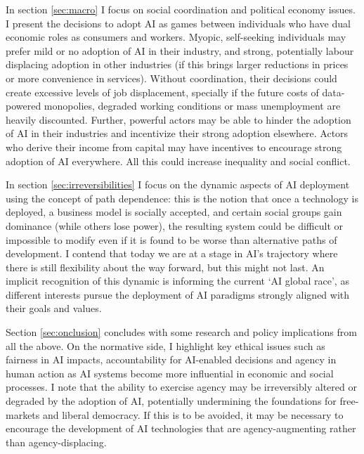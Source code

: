\documentclass[11pt]{article}
\begin{document}
 In section \ref{sec:macro} I focus on social coordination and political economy issues. I present the decisions to adopt AI as games between individuals who have dual economic roles as consumers and workers. Myopic, self-seeking individuals may prefer mild or no adoption of AI in their industry, and strong, potentially labour displacing adoption in other industries (if this brings larger reductions in prices or more convenience in services). Without coordination, their decisions could create excessive levels of job displacement, specially if the future costs of data-powered monopolies, degraded working conditions or mass unemployment are heavily discounted. Further, powerful actors may be able to hinder the adoption of AI in their industries and incentivize their strong adoption elsewhere. Actors who derive their income from capital may have incentives to encourage strong adoption of AI everywhere. All this could increase inequality and social conflict.
  
 In section \ref{sec:irreversibilities} I focus on the dynamic aspects of AI deployment using the concept of path dependence: this is the notion that once a technology is deployed, a business model is socially accepted, and certain social groups gain dominance (while others lose power), the resulting system could be difficult or impossible to modify even if it is found to be worse than alternative paths of development. I contend that today we are at a stage in AI's trajectory where there is still flexibility about the way forward, but this might not last. An implicit recognition of this dynamic is informing the current `AI global race', as different interests pursue the deployment of AI paradigms strongly aligned with their goals and values. 






 Section \ref{sec:onclusion} concludes with some research and policy implications from all the above. On the normative side, I highlight key ethical issues such as fairness in AI impacts, accountability for AI-enabled decisions and agency in human action as AI systems become more influential in economic and social processes. I note that the ability to exercise agency may be irreversibly altered or degraded by the adoption of AI, potentially undermining the foundations for free-markets and liberal democracy. If this is to be avoided, it may be necessary to encourage the development of AI technologies that are agency-augmenting rather than agency-displacing.
 
\end{document}
